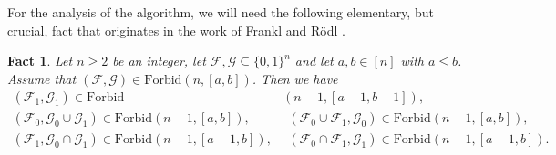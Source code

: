 \documentclass[10pt,a4paper]{amsart}
\newtheorem{fact}[thm]{Fact}
\theoremstyle{remark}
\newcommand{\meg}{\geqslant}
\newcommand{\mik}{\leqslant}
\newcommand{\Fcal}{\mathcal{F}}
\newcommand{\Gcal}{\mathcal{G}}
\begin{document}
For the analysis of the algorithm, we will need the following elementary, but crucial,
fact that originates in the work of Frankl and R\"{o}dl \cite{FR87}.
\begin{fact} \label{f5.1}
Let $n\meg 2$ be an integer, let $\Fcal,\Gcal\subseteq \{0,1\}^n$ and let $a,b\in [n]$ with $a\mik b$.
Assume that $(\Fcal,\Gcal)\in\mathrm{Forbid}(n,[a,b])$. Then we have
\begin{align}
\label{e5.1}  (\Fcal_1,\Gcal_1) \in  \mathrm{Forbid}&(n-1,[a-1,b-1]), \\
\label{e5.2}  (\Fcal_0,\Gcal_0\cup\Gcal_1)\in \mathrm{Forbid}(n-1,[a,b]), & \ \
(\Fcal_0\cup\Fcal_1,\Gcal_0)\in \mathrm{Forbid}(n-1,[a,b]), \\
\label{e5.3} (\Fcal_1,\Gcal_0\cap\Gcal_1)\in \mathrm{Forbid}(n-1,[a-1,b]), & \ \
(\Fcal_0\cap\Fcal_1,\Gcal_1)\in \mathrm{Forbid}(n-1,[a-1,b]).
\end{align}
\end{fact}
\end{document}
